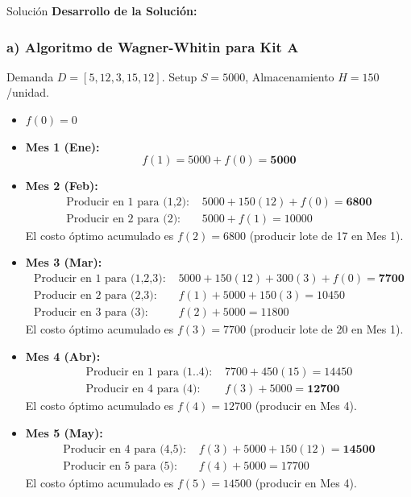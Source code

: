 \documentclass[11pt, a4paper]{article}
\begin{document}
  \medskip
  \begin{ejercicio}{Solución}
  \textbf{Desarrollo de la Solución:}

  \subsubsection*{a) Algoritmo de Wagner-Whitin para Kit A}
  Demanda $D = [5, 12, 3, 15, 12]$. Setup $S = 5000$, Almacenamiento $H = 150$/unidad.
  \begin{itemize}
    \item $f(0) = 0$
    \item \textbf{Mes 1 (Ene):}
      \begin{equation*}
        f(1) = 5000 + f(0) = \mathbf{5000}
      \end{equation*}
    \item \textbf{Mes 2 (Feb):}
      \begin{align*}
        \text{Producir en 1 para (1,2): } &5000 + 150(12) + f(0) = \mathbf{6800} \\
        \text{Producir en 2 para (2): } &5000 + f(1) = 10000
      \end{align*}
      El costo óptimo acumulado es $f(2) = 6800$ (producir lote de 17 en Mes 1).
    \item \textbf{Mes 3 (Mar):}
      \begin{align*}
        \text{Producir en 1 para (1,2,3): } &5000 + 150(12) + 300(3) + f(0) = \mathbf{7700} \\
        \text{Producir en 2 para (2,3): } &f(1) + 5000 + 150(3) = 10450 \\
        \text{Producir en 3 para (3): } &f(2) + 5000 = 11800
      \end{align*}
      El costo óptimo acumulado es $f(3) = 7700$ (producir lote de 20 en Mes 1).
    \item \textbf{Mes 4 (Abr):}
      \begin{align*}
        \text{Producir en 1 para (1..4): } &7700 + 450(15) = 14450 \\
        \text{Producir en 4 para (4): } &f(3) + 5000 = \mathbf{12700}
      \end{align*}
      El costo óptimo acumulado es $f(4) = 12700$ (producir en Mes 4).
    \item \textbf{Mes 5 (May):}
      \begin{align*}
        \text{Producir en 4 para (4,5): } &f(3) + 5000 + 150(12) = \mathbf{14500} \\
        \text{Producir en 5 para (5): } &f(4) + 5000 = 17700
      \end{align*}
      El costo óptimo acumulado es $f(5) = 14500$ (producir en Mes 4).
  \end{itemize}


\end{ejercicio}
\end{document}
